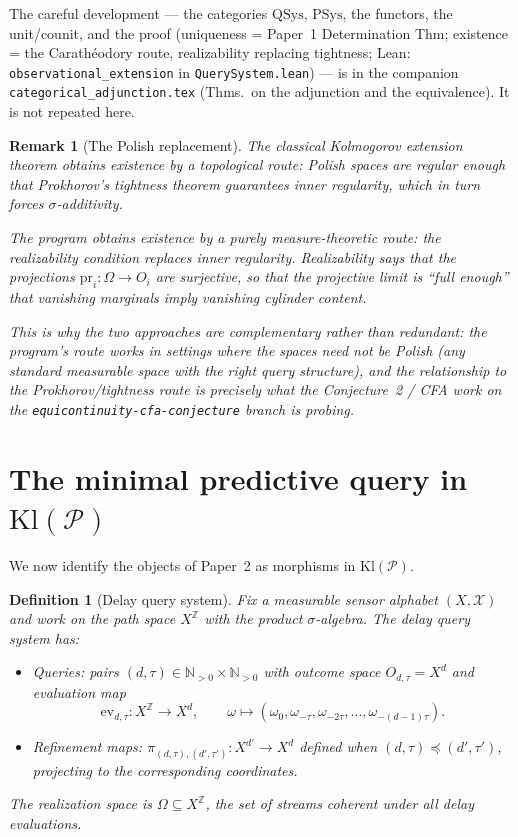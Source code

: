 \documentclass[11pt]{article}
\newtheorem{definition}{Definition}
\newtheorem{remark}{Remark}
\newcommand{\Kl}{\mathrm{Kl}}
\newcommand{\Pcal}{\mathcal{P}}
\newcommand{\Xcal}{\mathcal{X}}
\newcommand{\pr}{\mathrm{pr}}
\begin{document}
\noindent The careful development --- the categories $\mathrm{QSys}$,
$\mathrm{PSys}$, the functors, the unit/counit, and the proof (uniqueness =
Paper~1 Determination Thm; existence = the Carathéodory route, realizability
replacing tightness; Lean: \texttt{observational\_extension} in
\texttt{QuerySystem.lean}) --- is in the companion
\texttt{categorical\_adjunction.tex} (Thms.~on the adjunction and the
equivalence). It is not repeated here.

\begin{remark}[The Polish replacement]
The classical Kolmogorov extension theorem obtains existence by a topological
route: Polish spaces are regular enough that Prokhorov's tightness theorem
guarantees inner regularity, which in turn forces $\sigma$-additivity.

The program obtains existence by a purely measure-theoretic route: the
realizability condition replaces inner regularity.  Realizability says that
the projections $\pr_i : \Omega \to O_i$ are surjective, so that the
projective limit is ``full enough'' that vanishing marginals imply vanishing
cylinder content.

This is why the two approaches are complementary rather than redundant: the
program's route works in settings where the spaces need not be Polish (any
standard measurable space with the right query structure), and the
relationship to the Prokhorov/tightness route is precisely what the
Conjecture~2 / CFA work on the \texttt{equicontinuity-cfa-conjecture} branch
is probing.
\end{remark}

\section{The minimal predictive query in $\Kl(\Pcal)$}
\label{sec:predictive}

We now identify the objects of Paper~2 as morphisms in $\Kl(\Pcal)$.

\begin{definition}[Delay query system]
Fix a measurable sensor alphabet $(X, \Xcal)$ and work on the path space
$X^{\mathbb{Z}}$ with the product $\sigma$-algebra.  The \emph{delay query
system} has:
\begin{itemize}
  \item \emph{Queries}: pairs $(d, \tau) \in \mathbb{N}_{>0} \times \mathbb{N}_{>0}$
    with outcome space $O_{d,\tau} = X^d$ and evaluation map
    \[
      \mathrm{ev}_{d,\tau} : X^{\mathbb{Z}} \to X^d,
      \qquad
      \omega \mapsto (\omega_0, \omega_{-\tau}, \omega_{-2\tau}, \ldots, \omega_{-(d-1)\tau}).
    \]
  \item \emph{Refinement maps}: $\pi_{(d,\tau),(d',\tau')} : X^{d'} \to X^d$
    defined when $(d,\tau) \preceq (d',\tau')$, projecting to the
    corresponding coordinates.
\end{itemize}
The realization space is $\Omega \subseteq X^{\mathbb{Z}}$, the set of
streams coherent under all delay evaluations.
\end{definition}
\end{document}
